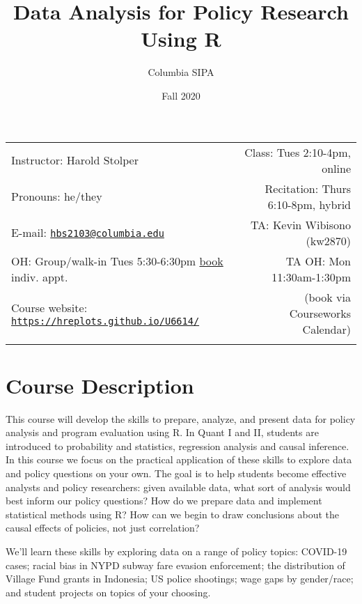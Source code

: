\documentclass[11pt,]{article}
\title{Data Analysis for Policy Research Using R}
\author{Columbia \textbar{} SIPA}
\date{Fall 2020}
\begin{document}
  

		\maketitle
		
	
		\thispagestyle{firststyle}



	\noindent \begin{tabular*}{\textwidth}{ @{\extracolsep{\fill}} lr @{\extracolsep{\fill}}}

Instructor: Harold Stolper & Class: Tues 2:10-4pm, online\\
Pronouns: he/they & Recitation: Thurs 6:10-8pm, hybrid\\
E-mail: \texttt{\href{mailto:hbs2103@columbia.edu}{\nolinkurl{hbs2103@columbia.edu}}} & TA: Kevin Wibisono (kw2870)\\
OH: Group/walk-in Tues 5:30-6:30pm \textbar{}
\href{https://helloharold.youcanbook.me}{book} indiv. appt.  &  TA OH: Mon 11:30am-1:30pm\\
Course website: \texttt{\url{https://hreplots.github.io/U6614/}} & (book via Courseworks Calendar)\\
	&  \\
	\hline
	\end{tabular*}
	
\vspace{2mm}
	


\hypertarget{course-description}{%
\section{Course Description}\label{course-description}}

This course will develop the skills to prepare, analyze, and present
data for policy analysis and program evaluation using R. In Quant I and
II, students are introduced to probability and statistics, regression
analysis and causal inference. In this course we focus on the practical
application of these skills to explore data and policy questions on your
own. The goal is to help students become effective analysts and policy
researchers: given available data, what sort of analysis would best
inform our policy questions? How do we prepare data and implement
statistical methods using R? How can we begin to draw conclusions about
the causal effects of policies, not just correlation?

We'll learn these skills by exploring data on a range of policy topics:
COVID-19 cases; racial bias in NYPD subway fare evasion enforcement; the
distribution of Village Fund grants in Indonesia; US police shootings;
wage gaps by gender/race; and student projects on topics of your
choosing.
\end{document}
